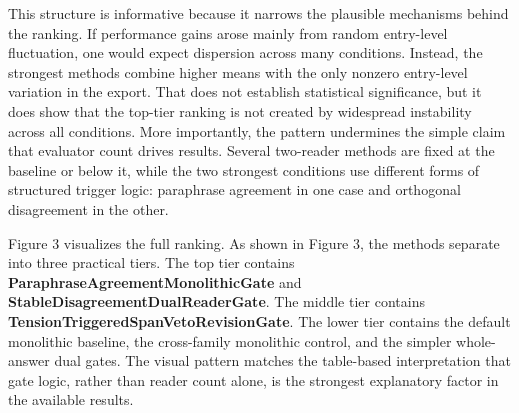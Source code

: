 \documentclass{article}
\begin{document}
\begin{table}[ht]
\centering
\caption{Performance comparison of different methods on Entry 0, Entry 1, Entry 2, Mean}
\label{tab:4}
\end{table}

This structure is informative because it narrows the plausible mechanisms behind the ranking. If performance gains arose mainly from random entry-level fluctuation, one would expect dispersion across many conditions. Instead, the strongest methods combine higher means with the only nonzero entry-level variation in the export. That does not establish statistical significance, but it does show that the top-tier ranking is not created by widespread instability across all conditions. More importantly, the pattern undermines the simple claim that evaluator count drives results. Several two-reader methods are fixed at the baseline or below it, while the two strongest conditions use different forms of structured trigger logic: paraphrase agreement in one case and orthogonal disagreement in the other.

Figure 3 visualizes the full ranking. As shown in Figure 3, the methods separate into three practical tiers. The top tier contains \textbf{ParaphraseAgreementMonolithicGate} and \textbf{StableDisagreementDualReaderGate}. The middle tier contains \textbf{TensionTriggeredSpanVetoRevisionGate}. The lower tier contains the default monolithic baseline, the cross-family monolithic control, and the simpler whole-answer dual gates. The visual pattern matches the table-based interpretation that gate logic, rather than reader count alone, is the strongest explanatory factor in the available results.
\end{document}
